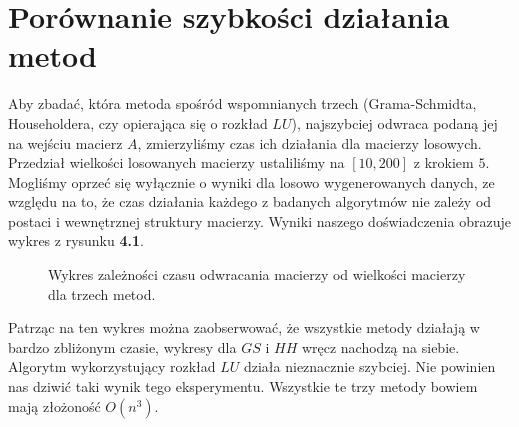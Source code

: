 \section{Porównanie szybkości działania metod}
Aby zbadać, która metoda spośród wspomnianych trzech (Grama-Schmidta, Householdera, czy
opierająca się o rozkład $LU$), najszybciej odwraca podaną jej na wejściu
macierz $A$, zmierzyliśmy czas ich działania dla macierzy losowych. Przedział
wielkości losowanych macierzy ustaliliśmy na $[10, 200]$ z krokiem $5$. Mogliśmy
oprzeć się wyłącznie o wyniki dla losowo wygenerowanych danych, ze względu na to,
że czas działania każdego z badanych algorytmów nie zależy od postaci i
wewnętrznej struktury macierzy. Wyniki naszego doświadczenia obrazuje wykres z
rysunku \textbf{4.1}.
\begin{figure}[h!tb]
\begin{center}

\caption{Wykres zależności czasu odwracania macierzy od wielkości macierzy dla trzech metod.}
\end{center}
\end{figure}

Patrząc na ten wykres można zaobserwować, że wszystkie metody działają w bardzo
zbliżonym czasie, wykresy dla $GS$ i $HH$ wręcz nachodzą na siebie. Algorytm
wykorzystujący rozkład $LU$ działa nieznacznie szybciej. Nie powinien nas dziwić
taki wynik tego eksperymentu. Wszystkie te trzy metody bowiem mają złożoność
$O(n^3)$.
